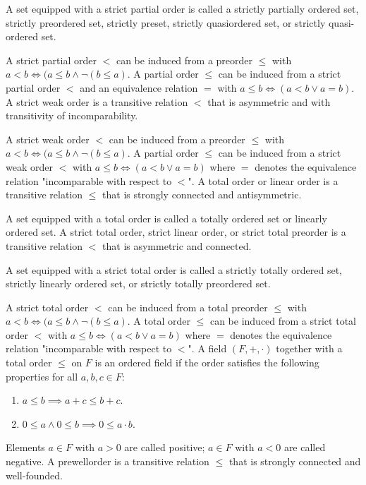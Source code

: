 \documentclass[a4paper,12pt]{article}
\begin{document}
A set equipped with a strict partial order is called a strictly partially ordered set, strictly preordered set, strictly preset, strictly quasiordered set, or strictly quasi-ordered set.

A strict partial order $<$ can be induced from a preorder $\leq$ with $a<b\iff(a\leq b\land \neg(b\leq a)$. A partial order $\leq$ can be induced from a strict partial order $<$ and an equivalence relation $=$ with $a\leq b\iff(a<b\lor a=b)$.
A strict weak order is a transitive relation $<$ that is asymmetric and with transitivity of incomparability.

A strict weak order $<$ can be induced from a preorder $\leq$ with $a<b\iff(a\leq b\land \neg(b\leq a)$. A partial order $\leq$ can be induced from a strict weak order $<$ with $a\leq b\iff(a<b\lor a=b)$ where $=$ denotes the equivalence relation "incomparable with respect to $<$".
A total order or linear order is a transitive relation $\leq$ that is strongly connected and antisymmetric.

A set equipped with a total order is called a totally ordered set or linearly ordered set.
A strict total order, strict linear order, or strict total preorder is a transitive relation $<$ that is asymmetric and connected.

A set equipped with a strict total order is called a strictly totally ordered set, strictly linearly ordered set, or strictly totally preordered set.

A strict total order $<$ can be induced from a total preorder $\leq$ with $a<b\iff(a\leq b\land \neg(b\leq a)$. A total order $\leq$ can be induced from a strict total order $<$ with $a\leq b\iff(a<b\lor a=b)$ where $=$ denotes the equivalence relation "incomparable with respect to $<$".
A field $(F,+,\cdot)$ together with a total order $\leq$ on $F$ is an ordered field if the order satisfies the following properties for all $a,b,c\in F$:
\begin{enumerate}
\item $a\leq b\implies a+c\leq b+c$.
\item $0\leq a\land 0\leq b\implies 0\leq a\cdot b$.
\end{enumerate}
Elements $a\in F$ with $a>0$ are called positive; $a\in F$ with $a<0$ are called negative.
A prewellorder is a transitive relation $\leq$ that is strongly connected and well-founded.
\end{document}
